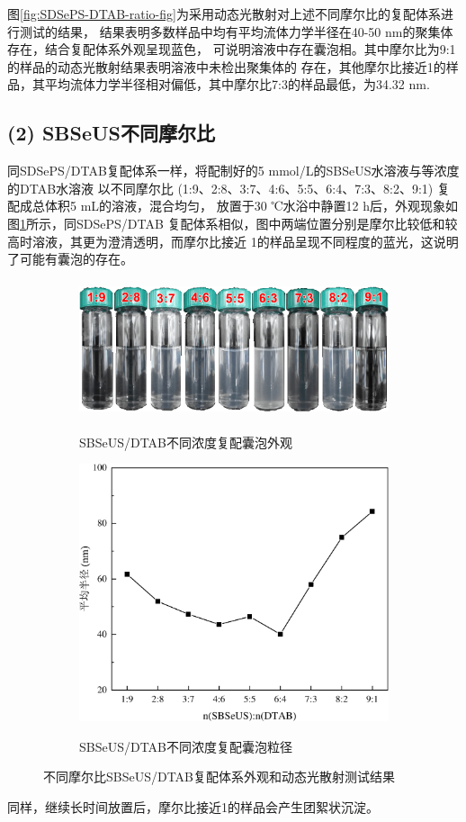 \documentclass[bachelor,winfonts,replaceperiod]{jnuthesis}
\begin{document}
    图\ref{fig:SDSePS-DTAB-ratio-fig}为采用动态光散射对上述不同摩尔比的复配体系进行测试的结果，
    结果表明多数样品中均有平均流体力学半径在40-50 nm的聚集体存在，结合复配体系外观呈现蓝色，
    可说明溶液中存在囊泡相。其中摩尔比为9:1的样品的动态光散射结果表明溶液中未检出聚集体的
    存在，其他摩尔比接近1的样品，其平均流体力学半径相对偏低，其中摩尔比7:3的样品最低，为34.32 nm.

    \subsection*{(2) SBSeUS不同摩尔比}
    同SDSePS/DTAB复配体系一样，将配制好的5 mmol/L的SBSeUS水溶液与等浓度的DTAB水溶液
    以不同摩尔比 (1:9、2:8、3:7、4:6、5:5、6:4、7:3、8:2、9:1) 复配成总体积5 mL的溶液，混合均匀，
    放置于30 ℃水浴中静置12 h后，外观现象如图\ref{fig:SBSeUS-DTAB-ratio}所示，同SDSePS/DTAB
    复配体系相似，图中两端位置分别是摩尔比较低和较高时溶液，其更为澄清透明，而摩尔比接近
    1的样品呈现不同程度的蓝光，这说明了可能有囊泡的存在。
    \begin{figure}[htbp]
        \centering
        \begin{subfigure}[]{\textwidth}
            \centering
            \includegraphics[height=4cm]{figure/SBSeUS-DTAB-ratio.png}\\
            \caption{SBSeUS/DTAB不同浓度复配囊泡外观}\label{fig:SBSeUS-DTAB-ratio}
        \end{subfigure}%

        \begin{subfigure}[]{\textwidth}
            \centering
            \includegraphics[width=.6\textwidth]{figure/SBSeUS-DTAB-ratio-fig.pdf}\\
            \caption{SBSeUS/DTAB不同浓度复配囊泡粒径}\label{fig:SBSeUS-DTAB-ratio-fig}
        \end{subfigure}%
        \caption{不同摩尔比SBSeUS/DTAB复配体系外观和动态光散射测试结果}
        \label{fig:不同摩尔比SBSeUS/DTAB}
    \end{figure}
    同样，继续长时间放置后，摩尔比接近1的样品会产生团絮状沉淀。
    
\end{document}
